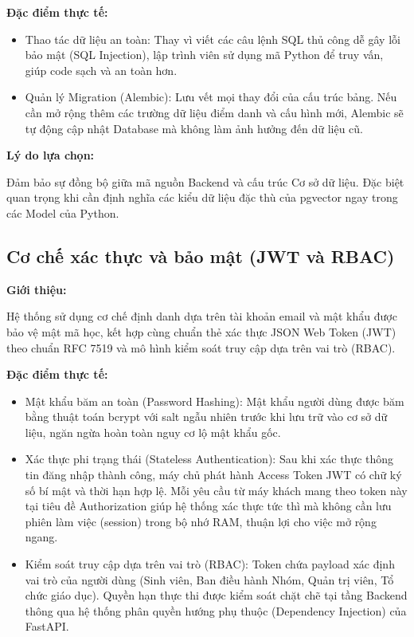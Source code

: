 \textbf{Đặc điểm thực tế:} 

\begin{itemize}
    \item Thao tác dữ liệu an toàn: Thay vì viết các câu lệnh SQL thủ công dễ gây lỗi bảo mật (SQL Injection), lập trình viên sử dụng mã Python để truy vấn, giúp code sạch và an toàn hơn.

    \item Quản lý Migration (Alembic): Lưu vết mọi thay đổi của cấu trúc bảng. Nếu cần mở rộng thêm các trường dữ liệu điểm danh và cấu hình mới, Alembic sẽ tự động cập nhật Database mà không làm ảnh hưởng đến dữ liệu cũ.
\end{itemize}

\textbf{Lý do lựa chọn:} 

Đảm bảo sự đồng bộ giữa mã nguồn Backend và cấu trúc Cơ sở dữ liệu. Đặc biệt quan trọng khi cần định nghĩa các kiểu dữ liệu đặc thù của pgvector ngay trong các Model của Python.

\subsection{Cơ chế xác thực và bảo mật (JWT và RBAC)}

\textbf{Giới thiệu:}

Hệ thống sử dụng cơ chế định danh dựa trên tài khoản email và mật khẩu được bảo vệ mật mã học, kết hợp cùng chuẩn thẻ xác thực JSON Web Token (JWT) theo chuẩn RFC 7519\cite{jones2015jwt} và mô hình kiểm soát truy cập dựa trên vai trò (RBAC)\cite{sandhu1996role}.

\textbf{Đặc điểm thực tế:}

\begin{itemize}
    \item Mật khẩu băm an toàn (Password Hashing): Mật khẩu người dùng được băm bằng thuật toán bcrypt với salt ngẫu nhiên trước khi lưu trữ vào cơ sở dữ liệu, ngăn ngừa hoàn toàn nguy cơ lộ mật khẩu gốc.
    \item Xác thực phi trạng thái (Stateless Authentication): Sau khi xác thực thông tin đăng nhập thành công, máy chủ phát hành Access Token JWT có chữ ký số bí mật và thời hạn hợp lệ. Mỗi yêu cầu từ máy khách mang theo token này tại tiêu đề Authorization giúp hệ thống xác thực tức thì mà không cần lưu phiên làm việc (session) trong bộ nhớ RAM, thuận lợi cho việc mở rộng ngang.
    \item Kiểm soát truy cập dựa trên vai trò (RBAC): Token chứa payload xác định vai trò của người dùng (Sinh viên, Ban điều hành Nhóm, Quản trị viên, Tổ chức giáo dục). Quyền hạn thực thi được kiểm soát chặt chẽ tại tầng Backend thông qua hệ thống phân quyền hướng phụ thuộc (Dependency Injection) của FastAPI.
\end{itemize}

